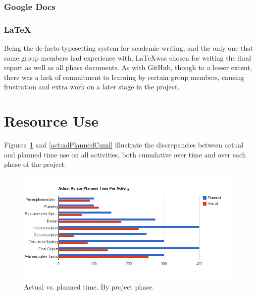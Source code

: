 \subsubsection{Google Docs}


\subsubsection{\LaTeX}
Being the de-facto typesetting system for academic writing, and the
only one that some group members had experience with, \LaTeX was
chosen for writing the final report as well as all phase documents. As
with GitHub, though to a lesser extent,  there was a lack of commitment to learning by certain
group members, causing frustration and extra work on a later stage
in the project.


\section{Resource Use}\label{resourceUse}

Figures~\ref{perActivity} and \ref{actualPlannedCuml} illustrate
the discrepancies between actual and planned time use on all
activities, both cumulative over time and over each phase of the project.

\begin{centering}
  \begin{figure}
    \includegraphics[width = \textwidth]{Evaluation/time_per_activity.png}
    \caption{Actual vs. planned time. By project phase.}
    \label{perActivity}
  \end{figure}
\end{centering}

